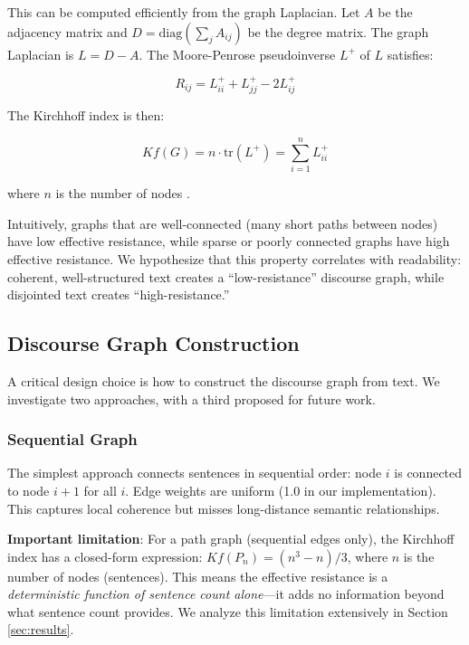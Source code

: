 \documentclass[11pt,letterpaper]{article}
\begin{document}
This can be computed efficiently from the graph Laplacian. Let $A$ be the adjacency matrix and $D = \text{diag}(\sum_j A_{ij})$ be the degree matrix. The graph Laplacian is $L = D - A$. The Moore-Penrose pseudoinverse $L^+$ of $L$ satisfies:

\begin{equation}
R_{ij} = L^+_{ii} + L^+_{jj} - 2L^+_{ij}
\end{equation}

The Kirchhoff index is then:

\begin{equation}
Kf(G) = n \cdot \text{tr}(L^+) = \sum_{i=1}^n L^+_{ii}
\end{equation}

where $n$ is the number of nodes \cite{Ellens2011}.

Intuitively, graphs that are well-connected (many short paths between nodes) have low effective resistance, while sparse or poorly connected graphs have high effective resistance. We hypothesize that this property correlates with readability: coherent, well-structured text creates a ``low-resistance'' discourse graph, while disjointed text creates ``high-resistance.''

\subsection{Discourse Graph Construction}

A critical design choice is how to construct the discourse graph from text. We investigate two approaches, with a third proposed for future work.

\subsubsection{Sequential Graph}

The simplest approach connects sentences in sequential order: node $i$ is connected to node $i+1$ for all $i$. Edge weights are uniform (1.0 in our implementation). This captures local coherence but misses long-distance semantic relationships. 

\textbf{Important limitation}: For a path graph (sequential edges only), the Kirchhoff index has a closed-form expression: $Kf(P_n) = (n^3 - n) / 3$, where $n$ is the number of nodes (sentences). This means the effective resistance is a \textit{deterministic function of sentence count alone}---it adds no information beyond what sentence count provides. We analyze this limitation extensively in Section \ref{sec:results}.
\end{document}
